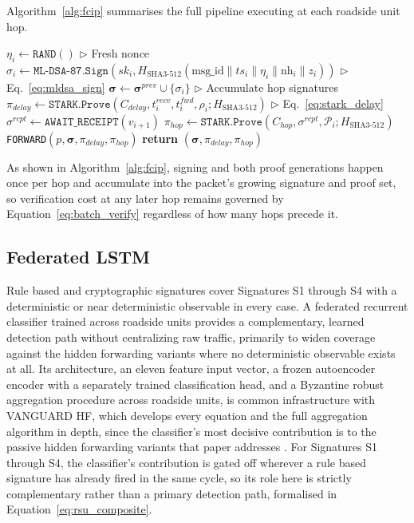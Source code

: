 \documentclass[final,5p,twocolumn]{elsarticle}
\renewcommand{\Comment}[1]{\hfill$\triangleright$ #1}
\theoremstyle{remark}
\theoremstyle{plain}
\begin{document}
Algorithm~\ref{alg:fcip} summarises the full pipeline executing at each
roadside unit hop.
\begin{algorithm}[!t]
	\caption{Full Cryptographic Integrity Pipeline (FCIP)}
	\label{alg:fcip}
	\begin{algorithmic}[1]
		\small
		\State $\eta_i \gets \texttt{RAND}()$ \Comment{Fresh nonce}
		\State $\sigma_i \gets \texttt{ML-DSA-87.Sign}(sk_i, H_{\text{SHA3-512}}(\text{msg\_id}\|ts_i\|\eta_i\|\text{nh}_i\|z_i))$ \Comment{Eq.~\eqref{eq:mldsa_sign}}
		\State $\boldsymbol{\sigma} \gets \boldsymbol{\sigma}^{prev} \cup \{\sigma_i\}$ \Comment{Accumulate hop signatures}
		\State $\pi_{delay} \gets \texttt{STARK.Prove}(C_{delay}, t^{recv}_i, t^{fwd}_i, \rho_i; H_{\text{SHA3-512}})$ \Comment{Eq.~\eqref{eq:stark_delay}}
		\State $\sigma^{rcpt} \gets \texttt{AWAIT\_RECEIPT}(v_{i+1})$
		\State $\pi_{hop} \gets \texttt{STARK.Prove}(C_{hop}, \sigma^{rcpt}, \mathcal{P}_i; H_{\text{SHA3-512}})$
		\State \texttt{FORWARD}$(p, \boldsymbol{\sigma}, \pi_{delay}, \pi_{hop})$
		\State \textbf{return} $(\boldsymbol{\sigma}, \pi_{delay}, \pi_{hop})$
		\EndProcedure
	\end{algorithmic}
\end{algorithm}
As shown in Algorithm~\ref{alg:fcip}, signing and both proof generations
happen once per hop and accumulate into the packet's growing signature and
proof set, so verification cost at any later hop remains governed by
Equation~\eqref{eq:batch_verify} regardless of how many hops precede it.


\subsection{Federated LSTM}
\label{sec:fed_lstm_brief}

Rule based and cryptographic signatures cover Signatures S1 through S4 with
a deterministic or near deterministic observable in every case. A federated
recurrent classifier trained across roadside units provides a complementary,
learned detection path without centralizing raw traffic, primarily to widen
coverage against the hidden forwarding variants where no deterministic
observable exists at all. Its architecture, an eleven feature input vector,
a frozen autoencoder encoder with a separately trained classification head,
and a Byzantine robust aggregation procedure across roadside units, is
common infrastructure with VANGUARD HF, which develops every equation and
the full aggregation algorithm in depth, since the classifier's most
decisive contribution is to the passive hidden forwarding variants that
paper addresses \cite{VanguardHF2026}. For Signatures S1 through S4, the
classifier's contribution is gated off wherever a rule based signature has
already fired in the same cycle, so its role here is strictly complementary
rather than a primary detection path, formalised in
Equation~\eqref{eq:rsu_composite}.
\end{document}
